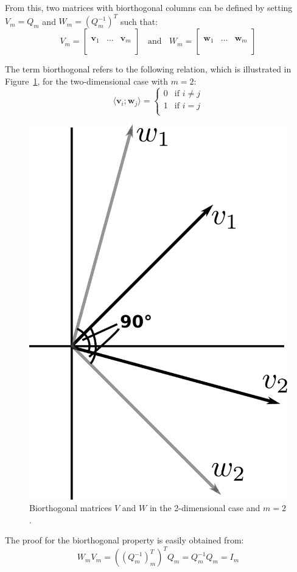 \noindent From this, two matrices with biorthogonal columns can be defined by setting $V_m=Q_m$ and $W_m=(Q_m^{-1})^T$ such that:
\begin{equation}
  V_m =
  \left[
    \begin{array}{c|c|c}
      & &  \\
      \bm{v}_1 & \dots & \bm{v}_m \\
      & &  \\
    \end{array}
  \right] \;\; \text{ and }\;\;
    W_m =
  \left[
    \begin{array}{c|c|c}
      & &  \\
      \bm{w}_1 & \dots & \bm{w}_m \\
      & &  \\
    \end{array}
  \right]
\end{equation}

\noindent The term biorthogonal refers to the following relation, which is illustrated in Figure~\hyperref[fig:biorthogonal]{\ref{fig:biorthogonal}}, for the two-dimensional case with $m=2$:
\begin{equation}
    \langle \bm{v}_i;\bm{w}_j\rangle =\begin{cases}
      0 & \text{if }i \neq j\\
      1 & \text{if }i = j\\
    \end{cases}  
\end{equation}

\begin{figure}[h]
    \centering
    \includegraphics[width=0.3\linewidth]{figures/biorthogonal.pdf}
    \caption[Biorthogonalization]{Biorthogonal matrices $V$ and $W$ in the 2-dimensional case and $m=2$.}
    \label{fig:biorthogonal}
\end{figure}

\noindent The proof for the biorthogonal property is easily obtained from:
\begin{equation}
    W_mV_m=((Q_m^{-1})^T_m)^TQ_m = Q_m^{-1}Q_m = I_m
\end{equation}

